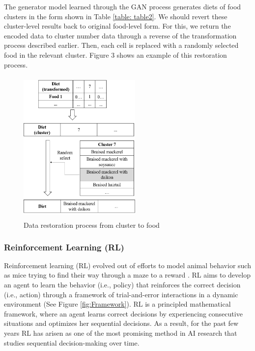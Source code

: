 \documentclass{article}
\begin{document}
The generator model learned through the GAN process generates diets of food clusters in the form shown in Table \ref{table: table2}. We should revert these cluster-level results back to original food-level form. For this, we return the encoded data to cluster number data through a reverse of the transformation process described earlier. Then, each cell is replaced with a randomly selected food in the relevant cluster. Figure 3 shows an example of this restoration process.

\begin{figure}[!ht]
    \centering
    \includegraphics[width = 6cm, height = 7.6cm]{images/menu_restore.png}
    \caption{Data restoration process from cluster to food}
    \label{fig:GAN_restore}
\end{figure} 


\newpage
\subsubsection{Reinforcement Learning (RL)} 

Reinforcement learning (RL) evolved out of efforts to model animal behavior such as mice trying to find their way through a maze to a reward \cite{powell2020}. RL aims to develop an agent to learn the behavior (i.e., policy) that reinforces the correct decision (i.e., action) through a framework of trial-and-error interactions in a dynamic environment \cite{kaelbling1996reinforcement} (See Figure \ref{fig:Framework}). RL is a principled mathematical framework, where an agent learns correct decisions by experiencing consecutive situations and optimizes her sequential decisions. As a result, for the past few years RL has arisen as one of the most promising method in AI research that studies sequential decision-making over time.
\end{document}
